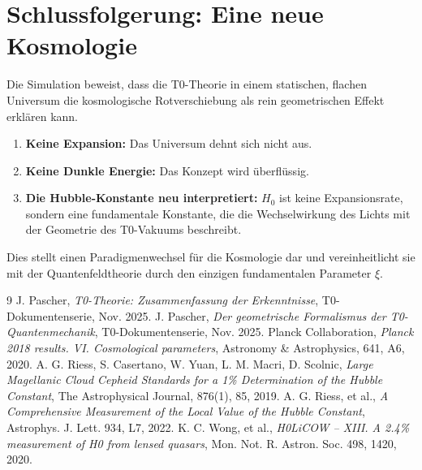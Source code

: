 	\section{Schlussfolgerung: Eine neue Kosmologie}
	Die Simulation beweist, dass die T0-Theorie in einem statischen, flachen Universum die kosmologische Rotverschiebung als rein geometrischen Effekt erklären kann.
	\begin{enumerate}
		\item \textbf{Keine Expansion:} Das Universum dehnt sich nicht aus.
		\item \textbf{Keine Dunkle Energie:} Das Konzept wird überflüssig.
		\item \textbf{Die Hubble-Konstante neu interpretiert:} $H_0$ ist keine Expansionsrate, sondern eine fundamentale Konstante, die die Wechselwirkung des Lichts mit der Geometrie des T0-Vakuums beschreibt.
	\end{enumerate}
	Dies stellt einen Paradigmenwechsel für die Kosmologie dar und vereinheitlicht sie mit der Quantenfeldtheorie durch den einzigen fundamentalen Parameter $\xi$.
	\begin{thebibliography}{9}
		J. Pascher, \textit{T0-Theorie: Zusammenfassung der Erkenntnisse}, T0-Dokumentenserie, Nov. 2025.
		J. Pascher, \textit{Der geometrische Formalismus der T0-Quantenmechanik}, T0-Dokumentenserie, Nov. 2025.
		Planck Collaboration, \textit{Planck 2018 results. VI. Cosmological parameters}, Astronomy \& Astrophysics, 641, A6, 2020.
		A. G. Riess, S. Casertano, W. Yuan, L. M. Macri, D. Scolnic, \textit{Large Magellanic Cloud Cepheid Standards for a 1\% Determination of the Hubble Constant}, The Astrophysical Journal, 876(1), 85, 2019.
		A. G. Riess, et al., \textit{A Comprehensive Measurement of the Local Value of the Hubble Constant}, Astrophys. J. Lett. 934, L7, 2022.
		K. C. Wong, et al., \textit{H0LiCOW -- XIII. A 2.4\% measurement of H0 from lensed quasars}, Mon. Not. R. Astron. Soc. 498, 1420, 2020.
	\end{thebibliography}

